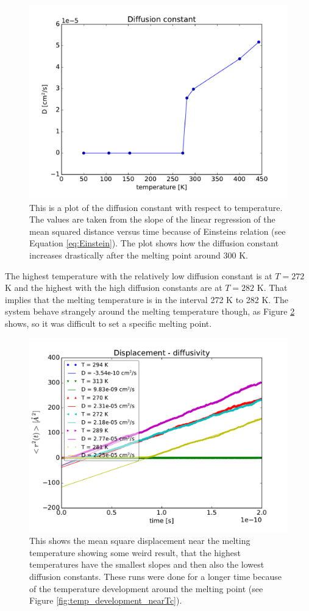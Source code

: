 \begin{figure}[H]
\center
\includegraphics[width=0.8\linewidth]{../figures/diffusion_temp}\caption{This is a plot of the diffusion constant with respect to temperature. The values are taken from the slope of the linear regression of the mean squared distance versus time because of Einsteins relation (see Equation \ref{eq:Einstein}). The plot shows how the diffusion constant increases drastically after the melting point around 300 K.}\label{fig:diffusion_temp}
\end{figure}


The highest temperature with the relatively low diffusion constant is at $T = 272$ K and the highest with the high diffusion constants are at $T = 282$ K. That implies that the melting temperature is in the interval 272 K to 282 K. The system behave strangely around the melting temperature though, as Figure \ref{fig:near_Tc} shows, so it was difficult to set a specific melting point.

\begin{figure}[H]
\center
\includegraphics[width=0.8\linewidth]{../figures/nearTc}\caption{This shows the mean square displacement near the melting temperature showing some weird result, that the highest temperatures have the smallest slopes and then also the lowest diffusion constants. These runs were done for a longer time because of the temperature development around the melting point (see Figure \ref{fig:temp_development_nearTc}).}\label{fig:near_Tc}
\end{figure}

